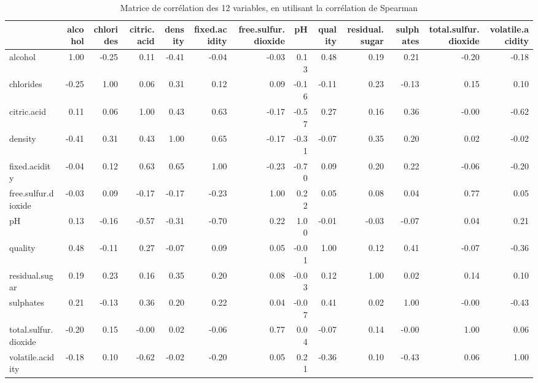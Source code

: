 \documentclass[11pt,a4paper]{article}
\begin{document}
\begin{table}[h]
	\centering
	\begin{adjustbox}{width=1\textwidth}
	\begin{tabular}{lrrrrrrrrrrrr}
		\hline
		& alcohol & chlorides & citric.acid & density & fixed.acidity & free.sulfur.dioxide & pH & quality & residual.sugar & sulphates & total.sulfur.dioxide & volatile.acidity \\ 
		\hline
		alcohol & 1.00 & -0.25 & 0.11 & -0.41 & -0.04 & -0.03 & 0.13 & 0.48 & 0.19 & 0.21 & -0.20 & -0.18 \\ 
		chlorides & -0.25 & 1.00 & 0.06 & 0.31 & 0.12 & 0.09 & -0.16 & -0.11 & 0.23 & -0.13 & 0.15 & 0.10 \\ 
		citric.acid & 0.11 & 0.06 & 1.00 & 0.43 & 0.63 & -0.17 & -0.57 & 0.27 & 0.16 & 0.36 & -0.00 & -0.62 \\ 
		density & -0.41 & 0.31 & 0.43 & 1.00 & 0.65 & -0.17 & -0.31 & -0.07 & 0.35 & 0.20 & 0.02 & -0.02 \\ 
		fixed.acidity & -0.04 & 0.12 & 0.63 & 0.65 & 1.00 & -0.23 & -0.70 & 0.09 & 0.20 & 0.22 & -0.06 & -0.20 \\ 
		free.sulfur.dioxide & -0.03 & 0.09 & -0.17 & -0.17 & -0.23 & 1.00 & 0.22 & 0.05 & 0.08 & 0.04 & 0.77 & 0.05 \\ 
		pH & 0.13 & -0.16 & -0.57 & -0.31 & -0.70 & 0.22 & 1.00 & -0.01 & -0.03 & -0.07 & 0.04 & 0.21 \\ 
		quality & 0.48 & -0.11 & 0.27 & -0.07 & 0.09 & 0.05 & -0.01 & 1.00 & 0.12 & 0.41 & -0.07 & -0.36 \\ 
		residual.sugar & 0.19 & 0.23 & 0.16 & 0.35 & 0.20 & 0.08 & -0.03 & 0.12 & 1.00 & 0.02 & 0.14 & 0.10 \\ 
		sulphates & 0.21 & -0.13 & 0.36 & 0.20 & 0.22 & 0.04 & -0.07 & 0.41 & 0.02 & 1.00 & -0.00 & -0.43 \\ 
		total.sulfur.dioxide & -0.20 & 0.15 & -0.00 & 0.02 & -0.06 & 0.77 & 0.04 & -0.07 & 0.14 & -0.00 & 1.00 & 0.06 \\ 
		volatile.acidity & -0.18 & 0.10 & -0.62 & -0.02 & -0.20 & 0.05 & 0.21 & -0.36 & 0.10 & -0.43 & 0.06 & 1.00 \\ 
		\hline
	\end{tabular}
	\end{adjustbox}
\caption{Matrice de corrélation des 12 variables, en utilisant la corrélation de Spearman}
\label{table:cor}
\end{table}
\FloatBarrier
\end{document}
